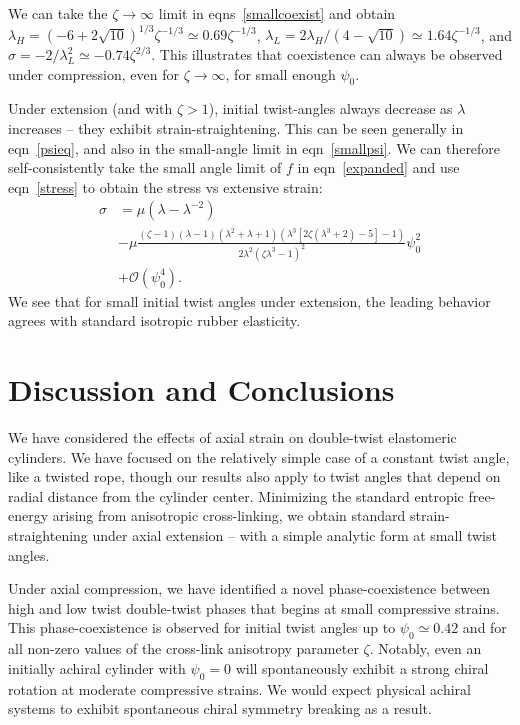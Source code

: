 \documentclass[twoside,twocolumn,9pt]{article}
\begin{document}
We can take the $\zeta \rightarrow \infty$ limit in eqns~\eqref{smallcoexist} and obtain $\lambda_H = (-6+2 \sqrt{10})^{1/3} \zeta^{-1/3} \simeq 0.69 \zeta^{-1/3}$, $\lambda_L = 2 \lambda_H/(4-\sqrt{10}) \simeq 1.64 \zeta^{-1/3}$, and $\sigma = -2/\lambda_L^2 \simeq -0.74 \zeta^{2/3}$. This illustrates that coexistence can always be observed under compression, even for $\zeta \rightarrow \infty$, for small enough $\psi_0$.

Under extension (and with $\zeta>1$), initial twist-angles always decrease as $\lambda$ increases  -- they exhibit strain-straightening. This can be seen generally in eqn~\eqref{psieq}, and also in the small-angle limit in eqn~\eqref{smallpsi}. We can therefore self-consistently take the small angle limit of $f$ in eqn~\eqref{expanded} and use eqn~\eqref{stress} to obtain the stress vs extensive strain:
\begin{equation}
\begin{aligned}
\sigma & = \mu\left(\lambda - \lambda^{-2}\right) \\
& - \mu \frac{(\zeta-1)(\lambda-1)(\lambda^2+\lambda+1)\left( \lambda^3 [2\zeta (\lambda^3+2) - 5]- 1\right)}{2\lambda^2 (\zeta\lambda^3 - 1)^2}\psi_0^2\\
& + \mathcal{O}(\psi_0^4).
\end{aligned}
\end{equation}
We see that for small initial twist angles under extension, the leading behavior agrees with standard isotropic rubber elasticity.

\section{Discussion and Conclusions}
We have considered the effects of axial strain on double-twist elastomeric cylinders. We have focused on the relatively simple case of a constant twist angle, like a twisted rope, though our results also apply to twist angles that depend on radial distance from the cylinder center. Minimizing the standard entropic free-energy arising from anisotropic cross-linking, we obtain standard strain-straightening under axial extension --  with a simple analytic form at small twist angles.

Under axial compression, we have identified a novel phase-coexistence between high and low twist double-twist phases that begins at small compressive strains. This phase-coexistence is observed for initial twist angles up to $\psi_0 \simeq 0.42$ and for all non-zero values of the cross-link anisotropy parameter $\zeta$. Notably, even an initially achiral cylinder with $\psi_0=0$ will spontaneously exhibit a strong chiral rotation at moderate compressive strains. We would expect physical achiral systems to exhibit spontaneous chiral symmetry breaking as a result. 
\end{document}
